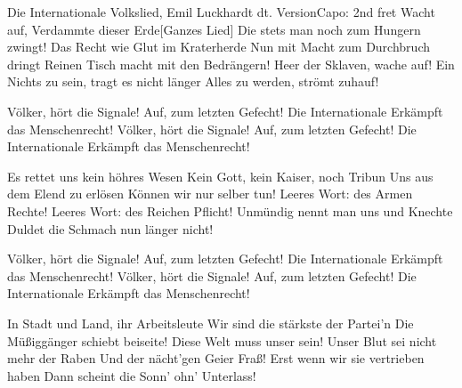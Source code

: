 \begin{song}{Die Internationale}
{Volkslied, Emil Luckhardt dt. Version}{Capo: 2nd fret}
Wacht auf, Verdammte dieser Erde[Ganzes Lied]
Die stets man noch zum Hungern zwingt!
Das Recht wie Glut im Kraterherde
Nun mit Macht zum Durchbruch dringt
Reinen Tisch macht mit den Bedrängern!
Heer der Sklaven, wache auf!
Ein Nichts zu sein, tragt es nicht länger
Alles zu werden, strömt zuhauf!

Völker, hört die Signale! Auf, zum letzten Gefecht!
Die Internationale Erkämpft das Menschenrecht!
Völker, hört die Signale! Auf, zum letzten Gefecht!
Die Internationale Erkämpft das Menschenrecht!

Es rettet uns kein höhres Wesen
Kein Gott, kein Kaiser, noch Tribun
Uns aus dem Elend zu erlösen
Können wir nur selber tun!
Leeres Wort: des Armen Rechte!
Leeres Wort: des Reichen Pflicht!
Unmündig nennt man uns und Knechte
Duldet die Schmach nun länger nicht!




Völker, hört die Signale! Auf, zum letzten Gefecht!
Die Internationale Erkämpft das Menschenrecht!
Völker, hört die Signale! Auf, zum letzten Gefecht!
Die Internationale Erkämpft das Menschenrecht!

In Stadt und Land, ihr Arbeitsleute
Wir sind die stärkste der Partei'n
Die Müßiggänger schiebt beiseite!
Diese Welt muss unser sein!
Unser Blut sei nicht mehr der Raben
Und der nächt'gen Geier Fraß!
Erst wenn wir sie vertrieben haben
Dann scheint die Sonn' ohn' Unterlass!


\end{song}
